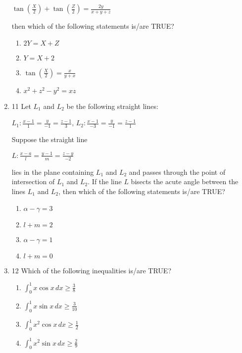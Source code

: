 \documentclass{article}
\begin{document}
\begin{enumerate}
\begin{center}
    $\tan\left(\frac{X}{2}\right) + \tan\left(\frac{Z}{2}\right) = \frac{2y}{x + y + z}$
\end{center}

    then which of the following statements is/are TRUE?

    \begin{enumerate}
        \item  $2Y = X + Z$
        \item  $Y = X + 2$
        \item  $\tan\left(\frac{X}{2}\right) = \frac{x}{y + x}$
        \item  $x^2 + z^2 - y^2 = xz$
    \end{enumerate}

\item 11  Let $L_1$ and $L_2$ be the following straight lines:

\begin{center}
    $L_1 :\frac{x - 1}{1} = \frac{y}{-1} = \frac{z - 1}{3}$, \quad 
    $L_2 : \frac{x - 1}{-3} = \frac{y}{-1} = \frac{z - 1}{1}$
\end{center}

    Suppose the straight line 

\begin{center}
    $L : \frac{x - a}{l} = \frac{y - 1}{m} = \frac{z - y}{-2}$
\end{center}

    lies in the plane containing $L_1$ and $L_2$ and passes through the point of intersection of $L_1$ and $L_2$. If the line $L$ bisects the acute angle between the lines $L_1$ and $L_2$, then which of the following statements is/are TRUE?

    \begin{enumerate}
        \item  $\alpha - \gamma = 3$
        \item  $l + m = 2$
        \item  $\alpha - \gamma = 1$
        \item  $l + m = 0$
    \end{enumerate}

\item 12  Which of the following inequalities is/are TRUE?

    \begin{enumerate}
        \item  $\int_0^1 x \cos x \,dx \geq \frac{3}{8}$
        \item  $\int_0^1 x \sin x \,dx \geq \frac{3}{10}$
        \item  $\int_0^1 x^2 \cos x \,dx \geq \frac{1}{2}$
        \item  $\int_0^1 x^2 \sin x \,dx \geq \frac{2}{9}$
    \end{enumerate}


\end{enumerate}
\end{document}
